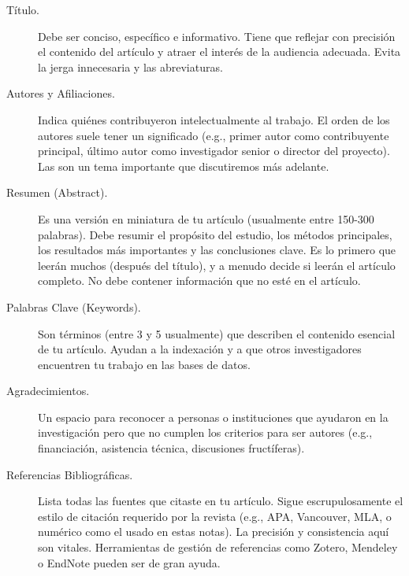 \begin{description}
  \item[Título.] Debe ser conciso, específico e informativo.
        Tiene que reflejar con precisión el contenido del artículo y atraer el
        interés de la audiencia adecuada.
        Evita la jerga innecesaria y las abreviaturas.

  \item[Autores y Afiliaciones.] Indica quiénes contribuyeron
        intelectualmente al trabajo.
        El orden de los autores suele tener un significado (e.g., primer autor
        como contribuyente principal, último autor como investigador senior o
        director del proyecto).
        Las  son un tema
        importante que discutiremos más adelante.

  \item[Resumen (Abstract).] Es una versión en miniatura de tu artículo
        (usualmente entre 150-300 palabras).
        Debe resumir el propósito del estudio, los métodos principales, los
        resultados más importantes y las conclusiones clave.
        Es lo primero que leerán muchos (después del título), y a menudo decide
        si leerán el artículo completo.
        No debe contener información que no esté en el artículo.

  \item[Palabras Clave (Keywords).] Son términos (entre 3 y 5 usualmente) que
        describen el contenido esencial de tu artículo.
        Ayudan a la indexación y a que otros investigadores encuentren tu trabajo
        en las bases de datos.

  \item[Agradecimientos.] Un espacio para reconocer a personas o instituciones
        que ayudaron en la investigación pero que no cumplen los criterios para
        ser autores (e.g., financiación, asistencia técnica, discusiones
        fructíferas).

  \item[Referencias Bibliográficas.] Lista todas las fuentes que citaste en
        tu artículo.
        Sigue escrupulosamente el estilo de citación requerido por la revista
        (e.g., APA, Vancouver, MLA, o numérico como el usado en estas notas).
        La precisión y consistencia aquí son vitales.
        Herramientas de gestión de referencias como Zotero, Mendeley o EndNote
        pueden ser de gran ayuda.
\end{description}

